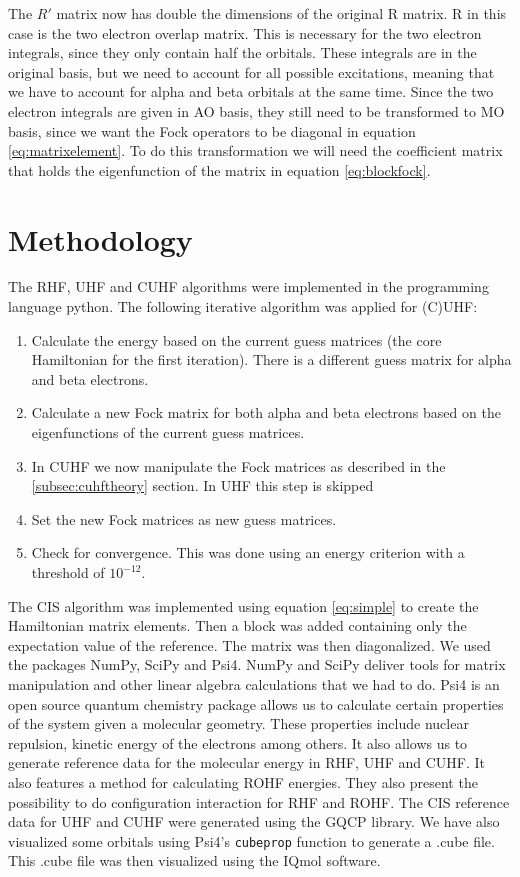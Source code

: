 \documentclass[twoside,twocolumn,9pt]{article}
\begin{document}
The $R'$ matrix now has double the dimensions of the original R matrix. R in this case is the two electron overlap matrix. This is necessary for the two electron integrals, since
they only contain half the orbitals. These integrals are in the original basis, but we need to account for all possible excitations, meaning that we have to account for alpha and
beta orbitals at the same time. Since the two electron integrals are given in AO basis, they still need to be transformed to MO basis, since we want the Fock operators to be
diagonal in equation \eqref{eq:matrixelement}. To do this transformation we will need the coefficient matrix that holds the eigenfunction of the matrix in equation
\eqref{eq:blockfock}.

\section{Methodology}
\label{sec:method}
The RHF, UHF and CUHF algorithms were implemented in the programming language python. The following iterative algorithm was applied for (C)UHF:
\begin{enumerate}
  \item Calculate the energy based on the current guess matrices (the core Hamiltonian for the first iteration). There is a different guess matrix for alpha and beta electrons.
  \item Calculate a new Fock matrix for both alpha and beta electrons based on the eigenfunctions of the current guess matrices.
  \item In CUHF we now manipulate the Fock matrices as described in the \ref{subsec:cuhftheory} section. In UHF this step is skipped
  \item Set the new Fock matrices as new guess matrices.
  \item Check for convergence. This was done using an energy criterion with a threshold of $10^{-12}$.
\end{enumerate}

The CIS algorithm was implemented using equation \eqref{eq:simple} to create the Hamiltonian matrix elements. Then a block was added containing only the expectation value of the 
reference. The matrix was then diagonalized.
We used the packages NumPy\cite{Numpy}, SciPy\cite{Scipy} and Psi4\cite{Psi4}. NumPy and SciPy deliver tools for matrix manipulation
and other linear algebra calculations that we had to do. Psi4 is an open source quantum chemistry package allows us to calculate certain properties of the system given a molecular
geometry. These properties include nuclear repulsion, kinetic energy of the electrons among others. It also allows us to generate reference data for the molecular energy in RHF, UHF
and CUHF. It also features a method for calculating ROHF energies. They also present the possibility to do configuration interaction for RHF and ROHF. The CIS reference data for
UHF and CUHF were generated using the GQCP\cite{GQCP} library. We have also visualized some orbitals using Psi4's \lstinline{cubeprop} function to generate a .cube file. This .cube
file was then visualized using the IQmol software\cite{IQmol}.
\end{document}
